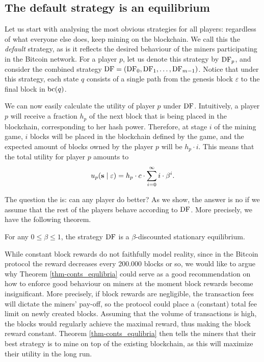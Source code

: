  \subsection{The default strategy is an equilibrium}

Let us start with analysing the most obvious strategies for all players: regardless of what everyone else does, keep mining on the blockchain. We call this 
the \emph{default} strategy, as is it reflects the desired behaviour of the miners participating in the Bitcoin network. 
For a player $p$, let us denote this strategy 
by $\text{\rm DF}_p$, and consider the combined strategy $\text{\rm DF} = (\text{\rm DF}_0,\text{\rm DF}_1,\dots,\text{\rm DF}_{m-1})$. Notice that under this strategy, each state $q$ consists of a single path from the genesis block $\varepsilon$ to the final block in $\text{bc}(q)$.

We can now easily calculate the utility of player $p$ under $\text{\rm DF}$. Intuitively, a player $p$ will receive a fraction $h_p$ of the next block that is being placed in the blockchain, corresponding to her hash power. Therefore, at stage $i$ of the mining game, $i$ blocks will be placed in the blockchain defined by the game, and the expected amount of blocks owned by the player $p$ will be $h_p\cdot i$. This means that the total utility for player $p$ amounts to 
$$u_p(\mathbf{s} \mid \varepsilon) = h_p \cdot c\cdot \sum_{i=0}^{\infty}i \cdot \beta^{i}.$$%


The question the is: can any player do better? As we show, the answer is no if we assume that the rest of the players behave according to $\text{\rm DF}$. More precisely, we have the following theorem.

\begin{mythm}\label{thm-conts_equlibria}
For any $0 \leq \beta \leq 1$, the strategy $\text{\rm DF}$ is a $\beta$-discounted stationary equilibrium.
\end{mythm} 

While constant block rewards do not faithfully model reality, since in the Bitcoin protocol the reward decreases every 200.000 blocks or so, we would like to argue why Theorem \ref{thm-conts_equlibria} could serve as a good recommendation on how to enforce good behaviour on miners at the moment block rewards become insignificant. More precisely, if block rewards are negligible, the transaction fees will dictate the miners' pay-off, so the protocol could place a (constant) total fee limit on newly created blocks. Assuming that the volume of transactions is high, the blocks would regularly achieve the maximal reward, thus making the block reward constant. Theorem \ref{thm-conts_equlibria} then tells the miners that their best strategy is to mine on top of the existing blockchain, as this will maximize their utility in the long run.


